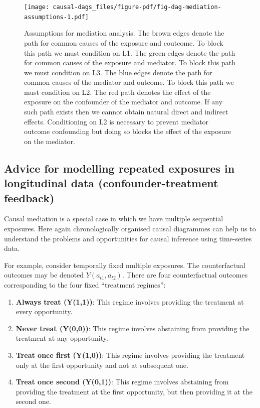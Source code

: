 \documentclass[
  singlecolumn]{report}
\begin{document}
\begin{figure}

{\centering \texttt{[image: causal-dags\_files/figure-pdf/fig-dag-mediation-assumptions-1.pdf]}

}

\caption{\label{fig-dag-mediation-assumptions}Assumptions for mediation
analysis. The brown edges denote the path for common causes of the
exposure and coutcome. To block this path we must condition on L1. The
green edges denote the path for common causes of the exposure and
mediator. To block this path we must condition on L3. The blue edges
denote the path for common causes of the mediator and outcome. To block
this path we must condition on L2. The red path denotes the effect of
the exposure on the confounder of the mediator and outcome. If any such
path exists then we cannot obtain natural direct and indirect effects.
Conditioning on L2 is necessary to prevent mediator outcome confounding
but doing so blocks the effect of the exposure on the mediator.}

\end{figure}

\hypertarget{advice-for-modelling-repeated-exposures-in-longitudinal-data-confounder-treatment-feedback}{%
\subsection{Advice for modelling repeated exposures in longitudinal data
(confounder-treatment
feedback)}\label{advice-for-modelling-repeated-exposures-in-longitudinal-data-confounder-treatment-feedback}}

Causal mediation is a special case in which we have multiple sequential
exposures. Here again chronologically organised causal diagrammes can
help us to understand the problems and opportunities for causal
inference using time-series data.

For example, consider temporally fixed multiple exposures. The
counterfactual outcomes may be denoted \(Y(a_{t1} ,a_{t2})\). There are
four counterfactual outcomes corresponding to the four fixed ``treatment
regimes'':

\begin{enumerate}
\def\labelenumi{\arabic{enumi}.}
\item
  \textbf{Always treat (Y(1,1))}: This regime involves providing the
  treatment at every opportunity.
\item
  \textbf{Never treat (Y(0,0))}: This regime involves abstaining from
  providing the treatment at any opportunity.
\item
  \textbf{Treat once first (Y(1,0))}: This regime involves providing the
  treatment only at the first opportunity and not at subsequent one.
\item
  \textbf{Treat once second (Y(0,1))}: This regime involves abstaining
  from providing the treatment at the first opportunity, but then
  providing it at the second one.
\end{enumerate}
\end{document}
